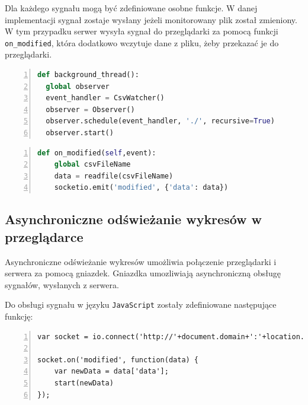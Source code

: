 \documentclass[a4paper]{article}
\begin{document}
    Dla każdego sygnału mogą być zdefiniowane osobne funkcje. 
    W danej implementacji sygnał zostaje wysłany 
    jeżeli monitorowany plik został zmieniony. W tym przypadku serwer wysyła sygnał
    do przeglądarki za pomocą funkcji \texttt{on\_modified}, która dodatkowo
    wczytuje dane z pliku, żeby przekazać je do przeglądarki.
   \begin{lstlisting}[frame=single, numbers=left, basicstyle=\ttfamily\small, language=python,
    caption={Definicja wątku, monitorującego zmiany w plikach o zadanym rozszerzeniu}]
def background_thread():
  global observer
  event_handler = CsvWatcher()
  observer = Observer()
  observer.schedule(event_handler, './', recursive=True)
  observer.start()
   \end{lstlisting}

\begin{lstlisting}[frame=single, numbers=left, basicstyle=\ttfamily\small, language=python,
    caption={Definicja funkcji wysyłającej sygnał i dane}]
def on_modified(self,event):
    global csvFileName
    data = readfile(csvFileName)
    socketio.emit('modified', {'data': data})
   \end{lstlisting}

    \subsection{Asynchroniczne odświeżanie wykresów w przeglądarce}
    Asynchroniczne odświeżanie wykresów umożliwia połączenie przeglądarki i serwera za pomocą gniazdek.
    Gniazdka umozliwiają asynchroniczną obsługę sygnałów, wysłanych z serwera.
    
    Do obsługi sygnału w języku \texttt{JavaScript} zostały zdefiniowane następujące funkcję:
\begin{lstlisting}[frame=single, numbers=left, basicstyle=\ttfamily\small,
    caption={Połączenie gniazdek w przeglądrce z serwerem i odebranie danych}]
var socket = io.connect('http://'+document.domain+':'+location.port);

socket.on('modified', function(data) {
    var newData = data['data'];
    start(newData)
});

\end{lstlisting}





\end{document}
